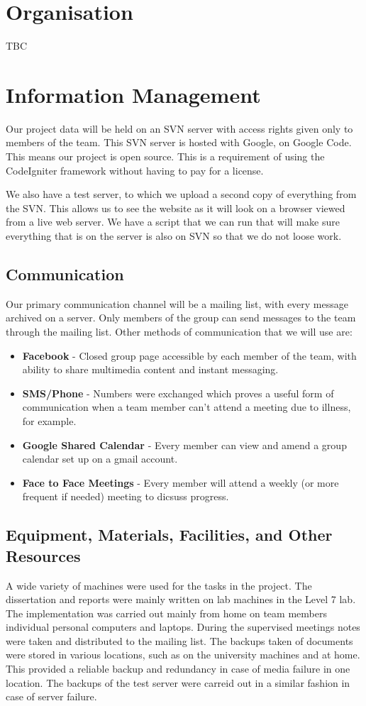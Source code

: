 \documentclass{l3proj}
\begin{document}
\section{Organisation}
\label{sect:org}
TBC

\section{Information Management}
\label{sect:info-man}
Our project data will be held on an SVN server with access rights given only to members of the team. This SVN server is hosted with Google, on Google Code. This means our project is open source. This is a requirement of using the CodeIgniter framework without having to pay for a license. 

We also have a test server, to which we upload a second copy of everything from the SVN. This allows us to see the website as it will look on a browser viewed from a live web server. We have a script that we can run that will make sure everything that is on the server is also on SVN so that we do not loose work.

\subsection{Communication}
Our primary communication channel will be a mailing list, with every message archived on a server. Only members of the group can send messages to the team through the mailing list. Other methods of communication that we will use are:
\begin{itemize}
\item \textbf{Facebook} - Closed group page accessible by each member of the team, with ability to share multimedia content and instant messaging.
\item \textbf{SMS/Phone} - Numbers were exchanged which proves a useful form of communication when a team member can't attend a meeting due to illness, for example.
\item \textbf{Google Shared Calendar} - Every member can view and amend a group calendar set up on a gmail account.
\item \textbf{Face to Face Meetings} - Every member will attend a weekly (or more frequent if needed) meeting to dicsuss progress.
\end{itemize}

\subsection{Equipment, Materials, Facilities, and Other Resources}
A wide variety of machines were used for the tasks in the project. The dissertation and reports were mainly written on lab machines in the Level 7 lab.
The implementation was carried out mainly from home on team members individual personal computers and laptops. \newline
During the supervised meetings notes were taken and distributed to the mailing list.
The backups taken of documents were stored in various locations, such as on the university machines and at home. This provided a reliable backup and redundancy in case of media failure in one location. The backups of the test server were carreid out in a similar fashion in case of server failure.
\end{document}
